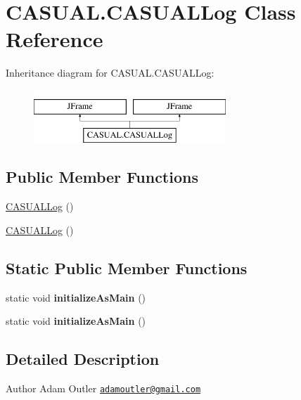 \hypertarget{classCASUAL_1_1CASUALLog}{\section{C\-A\-S\-U\-A\-L.\-C\-A\-S\-U\-A\-L\-Log Class Reference}
\label{classCASUAL_1_1CASUALLog}
}
Inheritance diagram for C\-A\-S\-U\-A\-L.\-C\-A\-S\-U\-A\-L\-Log\-:\begin{figure}[H]
\begin{center}
\leavevmode
\includegraphics[height=2.000000cm]{classCASUAL_1_1CASUALLog}
\end{center}
\end{figure}
\subsection*{Public Member Functions}
\begin{DoxyCompactItemize}
\item 
\hyperlink{classCASUAL_1_1CASUALLog_a0bcbd377259e114aa031876b0f5a7419}{C\-A\-S\-U\-A\-L\-Log} ()
\item 
\hyperlink{classCASUAL_1_1CASUALLog_a0bcbd377259e114aa031876b0f5a7419}{C\-A\-S\-U\-A\-L\-Log} ()
\end{DoxyCompactItemize}
\subsection*{Static Public Member Functions}
\begin{DoxyCompactItemize}
\item 
\hypertarget{classCASUAL_1_1CASUALLog_a5325dec9b72cc8c9634d9e4eea19863c}{static void {\bfseries initialize\-As\-Main} ()}\label{classCASUAL_1_1CASUALLog_a5325dec9b72cc8c9634d9e4eea19863c}

\item 
\hypertarget{classCASUAL_1_1CASUALLog_a5325dec9b72cc8c9634d9e4eea19863c}{static void {\bfseries initialize\-As\-Main} ()}\label{classCASUAL_1_1CASUALLog_a5325dec9b72cc8c9634d9e4eea19863c}

\end{DoxyCompactItemize}


\subsection{Detailed Description}
\begin{DoxyAuthor}{Author}
Adam Outler \href{mailto:adamoutler@gmail.com}{\tt adamoutler@gmail.\-com} 
\end{DoxyAuthor}


